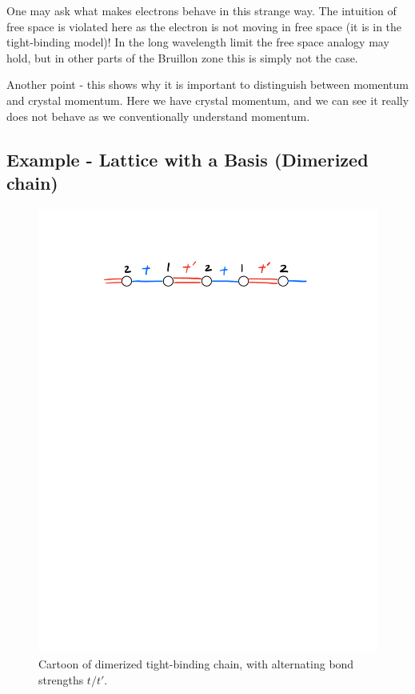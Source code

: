 One may ask what makes electrons behave in this strange way. The intuition of free space is violated here as the electron is not moving in free space (it is in the tight-binding model)! In the long wavelength limit the free space analogy may hold, but in other parts of the Bruillon zone this is simply not the case.

Another point - this shows why it is important to distinguish between momentum and crystal momentum. Here we have crystal momentum, and we can see it really does not behave as we conventionally understand momentum.

\subsection{Example - Lattice with a Basis (Dimerized chain)}
\begin{figure}[htbp]
    \centering
    \includegraphics[scale=0.5]{Images/fig-dimerizedchain.pdf}
    
    \caption{Cartoon of dimerized tight-binding chain, with alternating bond strengths $t/t'$.}
    \label{fig-dimerizedchain}
\end{figure}

